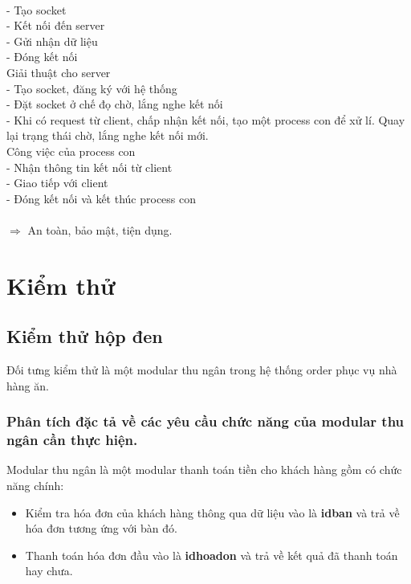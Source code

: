 \documentclass[a4paper,12pt]{report}
\begin{document}
\begin{itemize}
	\\ \hspace*{3mm} - Tạo socket
	\\ \hspace*{3mm} - Kết nối đến server
	\\ \hspace*{3mm} - Gửi nhận dữ liệu
	\\ \hspace*{3mm} - Đóng kết nối
	\\ Giải thuật cho server
	\\ \hspace*{3mm} - Tạo socket, đăng ký với hệ thống
	\\ \hspace*{3mm} - Đặt socket ở chế đọ chờ, lắng nghe kết nối
	\\ \hspace*{3mm} - Khi có request từ client, chấp nhận kết nối, tạo một process con để xử lí. Quay lại trạng thái chờ, lắng nghe kết nối mới.
	\\ Công việc của process con
	\\ \hspace*{3mm} - Nhận thông tin kết nối từ client
	\\ \hspace*{3mm} - Giao tiếp với client
	\\ \hspace*{3mm} - Đóng kết nối và kết thúc process con
	\\
	\\ $\Rightarrow$ An toàn, bảo mật, tiện dụng.
	
\end{itemize}
\chapter{Kiểm thử}
\section{Kiểm thử hộp đen}
Đối tưng kiểm thử là một modular thu ngân trong hệ thống order phục vụ nhà hàng ăn.
\subsection{Phân tích đặc tả về các yêu cầu chức năng của modular thu ngân cần thực hiện.}
Modular thu ngân là một modular thanh toán tiền cho khách hàng gồm có chức năng chính:
\begin{itemize}
\item Kiểm tra hóa đơn của khách hàng thông qua dữ liệu vào là \textbf{idban} và trả về hóa đơn tương ứng với bàn đó.
\item Thanh toán hóa đơn đầu vào là \textbf{idhoadon} và trả về kết quả đã thanh toán hay chưa.
\end{itemize}
\end{document}
